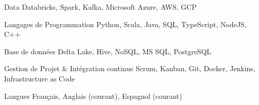 \begin{cvskills}

	\cvskill
	{Data}
	{Databricks, Spark, Kafka, Microsoft Azure, AWS, GCP}

	\cvskill
	{Langages de Programmation}
	{Python, Scala, Java, SQL, TypeScript, NodeJS, C++}
	
	\cvskill
	{Base de données}
	{Delta Lake, Hive, NoSQL, MS SQL, PostgreSQL}
	
	\cvskill
	{Gestion de Projet \& Intégration continue}
	{Scrum, Kanban, Git, Docker, Jenkins, Infrastructure as Code}
	
	\cvskill
	{Langues}
	{Français, Anglais (courant), Espagnol (courant)}
	
\end{cvskills}